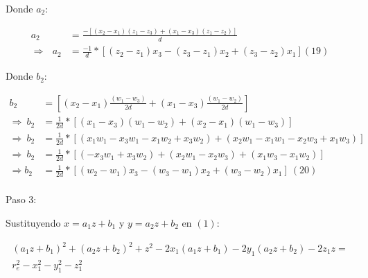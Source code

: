         Donde $a_{2}$:
        
        \begin{align*}
         a_{2}&=\frac{- \left[  \left( x_{2}-x_{1} \right)  \left( z_{1}-z_{3} \right) + \left( x_{1}-x_{3} \right)  \left( z_{1}-z_{2} \right)  \right] }{d} \\
         \Longrightarrow ~~~ a_{2}&=\frac{-1}{d}\ast \left[  \left( z_{2}-z_{1} \right) x_{3}- \left( z_{3}-z_{1} \right) x_{2}+ \left( z_{3}-z_{2} \right) x_{1} \right]   \left( 19 \right) 
        \end{align*}
        
        Donde $b_{2}$:

        \begin{align*}
             b_{2}&= \left[  \left( x_{2}-x_{1} \right) \frac{ \left( w_{1} - w_{3} \right) }{2d}+ \left( x_{1}-x_{3} \right) \frac{ \left( w_{1} - w_{2} \right) }{2d} \right]\\
             \Longrightarrow ~ b_{2}&=\frac{1}{2d}\ast \left[  \left( x_{1}-x_{3} \right)  \left( w_{1} - w_{2} \right) + \left( x_{2}-x_{1} \right)  \left( w_{1} - w_{3} \right)  \right]\\
             \Longrightarrow ~ b_{2}&=\frac{1}{2d}\ast \left[  \left( x_{1}w_{1}-x_{3}w_{1}-x_{1}w_{2}+x_{3}w_{2} \right) + \left( x_{2}w_{1}-x_{1}w_{1}-x_{2}w_{3}+x_{1}w_{3} \right)  \right]\\
             \Longrightarrow ~ b_{2}&=\frac{1}{2d}\ast \left[  \left( -x_{3}w_{1}+x_{3}w_{2} \right) + \left( x_{2}w_{1}-x_{2}w_{3} \right) + \left( x_{1}w_{3}-x_{1}w_{2} \right) \right]\\
            \Longrightarrow b_{2}&=\frac{1}{2d}\ast \left[  \left( w_{2}-w_{1} \right) x_{3}- \left( w_{3}-w_{1} \right) x_{2}+ \left( w_{3}-w_{2} \right) x_{1}\right] ~  \left( 20 \right)  \\ 
        \end{align*}

\newpage


        Paso 3:

        Sustituyendo $x= a_{1}z+ b_{1}$ y $y= a_{2}z+ b_{2}$ en $(1)$:

        \vspace{-1em}
        \begin{multline*}
             \left( a_{1}z+ b_{1} \right) ^{2}+ \left( a_{2}z+ b_{2} \right) ^{2} +z^{2}-2x_{1} \left( a_{1}z+ b_{1} \right) -2y_{1} \left( a_{2}z+ b_{2} \right) -2z_{1}z =\\ r_{e}^{2}- x_{1}^{2}- y_{1}^{2}-z_{1}^{2}             
        \end{multline*}


